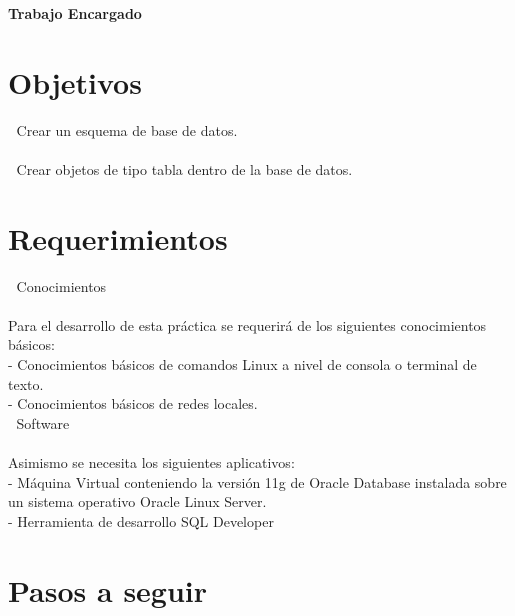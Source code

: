 
\begin{Large}
\begin{center}
\textbf{Trabajo Encargado} \\
\end{center}
\end{Large}

\section{Objetivos} 


\begin{itemize}

 Crear un esquema de base de datos.
\\\\
 Crear objetos de tipo tabla dentro de la base de datos.\\

\end{itemize} 

\section{Requerimientos} 

\begin{itemize}
 Conocimientos\\\\
Para el desarrollo de esta práctica se requerirá de los siguientes conocimientos básicos:\\
- Conocimientos básicos de comandos Linux a nivel de consola o terminal de texto.\\
- Conocimientos básicos de redes locales.\\
 Software\\\\
Asimismo se necesita los siguientes aplicativos:\\
- Máquina Virtual conteniendo la versión 11g de Oracle Database instalada sobre un sistema operativo Oracle
Linux Server.\\
- Herramienta de desarrollo SQL Developer\\



\end{itemize} 

\section{Pasos a seguir}
\begin{itemize}
    
    
\end{itemize}
